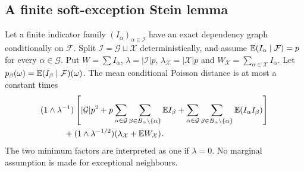 \subsection{A finite soft-exception Stein lemma}
\begin{lemma}\label{supp:lem:soft-retention}
Let a finite indicator family $(I_\alpha)_{\alpha\in\mathcal I}$ have an
exact dependency graph conditionally on $\mathcal F$. Split
$\mathcal I=\mathcal G\sqcup\mathcal X$ deterministically, and assume
$\mathbb E(I_\alpha\mid\mathcal F)=p$ for every $\alpha\in\mathcal G$.
Put $W=\sum I_\alpha$, $\lambda=|\mathcal I|p$,
$\lambda_{\mathcal X}=|\mathcal X|p$ and
$W_{\mathcal X}=\sum_{\alpha\in\mathcal X}I_\alpha$.
Let $p_\beta(\omega)=\mathbb E(I_\beta\mid\mathcal F)(\omega)$. The mean
conditional Poisson distance is at most a constant times
\begin{align}
 &(1\wedge\lambda^{-1})\left[|\mathcal G|p^2+
     p\sum_{\alpha\in\mathcal G}\sum_{\beta\in B_\alpha\setminus\{\alpha\}}
                                     \EE I_\beta
     +\sum_{\alpha\in\mathcal G}\sum_{\beta\in B_\alpha\setminus\{\alpha\}}
                                     \EE(I_\alpha I_\beta)\right]\notag\\
 &\hspace{10mm}+(1\wedge\lambda^{-1/2})
                          (\lambda_{\mathcal X}+\EE W_{\mathcal X}).
 \label{supp:eq:soft-finite}
\end{align}
The two minimum factors are interpreted as one if $\lambda=0$.
No marginal assumption is made for exceptional neighbours.
\end{lemma}
